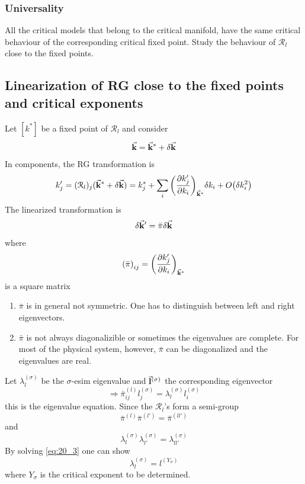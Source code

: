 \documentclass[../main/main.tex]{subfiles}
\begin{document}
\subsubsection{Universality}
All the critical models that belong to the critical manifold, have the same critical behaviour of the corresponding critical fixed point. Study the behaviour of \( \mathcal{R}_l \) close to the fixed points.

\subsection{Linearization of RG close to the fixed points and critical exponents}
Let \( [k^*] \) be a fixed point of \( \mathcal{R}_l \) and consider
\begin{equation}
  \va{k} = \va{k}^* + \delta \va{k}
\end{equation}
In components, the RG transformation is
\begin{equation}
  k'_j = (\mathcal{R}_l)_j (\va{k}^*+ \delta \va{k} )
= k^*_j + \sum_{i}^{} \qty(\pdv{k_j'}{k_i} )_{\va{k}^*} \delta k_i + O \qty(\delta k_i^2)
\end{equation}
The linearized transformation is
\begin{equation}
  \delta \va{k}' = \bar{\pi } \delta \va{k}
\end{equation}
where
\begin{equation}
  \qty(\bar{\pi } )_{ij} = \qty(\pdv{k_j'}{k_i} )_{\va{k}^*}
\end{equation}
is a square matrix
\begin{enumerate}
\item \( \bar{\pi }  \) is in general not symmetric. One has to distinguish between left and right eigenvectors.
\item \( \bar{\pi }  \) is not always diagonalizible or sometimes the eigenvalues are complete. For most of the physical system, however, \( \bar{\pi }  \) can be diagonalized and the eigenvalues are real.
\end{enumerate}
Let \( \lambda _l^{(\sigma)} \) be the \( \sigma  \)-esim eigenvalue and \( \va{l}^{(\sigma )} \) the corresponding eigenvector
\begin{equation}
  \Rightarrow \bar{\pi }^{(l)}_{ij} l^{(\sigma )}_j = \lambda _l^{(\sigma )} l_i ^{(\sigma )}
\end{equation}
this is the eigenvalue equation.
Since the \( \mathcal{R}_l \)'s form a semi-group
\begin{equation}
  \bar{\pi }^{(l)} \bar{\pi }^{(l')} = \bar{\pi }^{(ll')}
\end{equation}
and
\begin{equation}
  \lambda _l^{(\sigma )} \lambda _{l'}^{(\sigma )} =  \lambda _{ll'}^{(\sigma )}
  \label{eq:20_3}
\end{equation}
By solving \eqref{eq:20_3} one can show
\begin{equation}
   \lambda _{l}^{(\sigma )} = l^{(Y_\sigma)}
\end{equation}
where \( Y_\sigma \) is the critical exponent to be determined.
\end{document}
